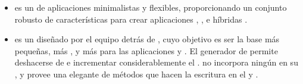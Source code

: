 \begin{itemize}
			\item
				\textbf{\expressjsNAME} es un \frameworkPC de aplicaciones \webINT \nodejsNAME minimalistas y flexibles, proporcionando un conjunto robusto de características  para crear aplicaciones \webINT \single, \multipage, e híbridas \cite{online_technology_expressjs_officialsite}.

			\item
				\textbf{\koaNAME} es un \frameworkPC \webINT diseñado por el equipo detrás de \expressjsNAME, cuyo objetivo es ser la base más pequeñas, más \expressiveQA, y más \robustQA para las aplicaciones \webINT y \apisAS. El generador de \koaNAME permite deshacerse de \callbacksPL e incrementar considerablemente el \errorHandlingPL. \koaNAME no incorpora ningún \middlewareAS en su \coreAS, y provee una elegante \suitePC de métodos que hacen la escritura en el \serverAS \fastQA y \enjoyableQA \cite{online_technology_koa_officialsite}.

		\end{itemize}

